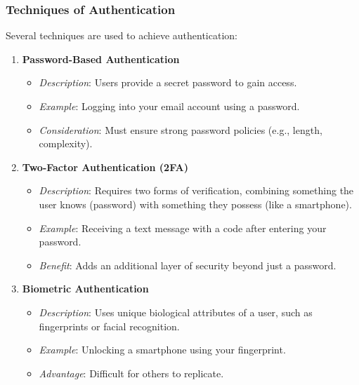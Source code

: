 \documentclass{beamer}
\begin{document}
\begin{frame}[fragile]
    \frametitle{Techniques of Authentication}
    Several techniques are used to achieve authentication:

    \begin{enumerate}
        \item \textbf{Password-Based Authentication} 
        \begin{itemize}
            \item \textit{Description}: Users provide a secret password to gain access.
            \item \textit{Example}: Logging into your email account using a password.
            \item \textit{Consideration}: Must ensure strong password policies (e.g., length, complexity).
        \end{itemize}

        \item \textbf{Two-Factor Authentication (2FA)}
        \begin{itemize}
            \item \textit{Description}: Requires two forms of verification, combining something the user knows (password) with something they possess (like a smartphone).
            \item \textit{Example}: Receiving a text message with a code after entering your password.
            \item \textit{Benefit}: Adds an additional layer of security beyond just a password.
        \end{itemize}
        
        \item \textbf{Biometric Authentication} 
        \begin{itemize}
            \item \textit{Description}: Uses unique biological attributes of a user, such as fingerprints or facial recognition.
            \item \textit{Example}: Unlocking a smartphone using your fingerprint.
            \item \textit{Advantage}: Difficult for others to replicate.
        \end{itemize}
    \end{enumerate}
\end{frame}
\end{document}
